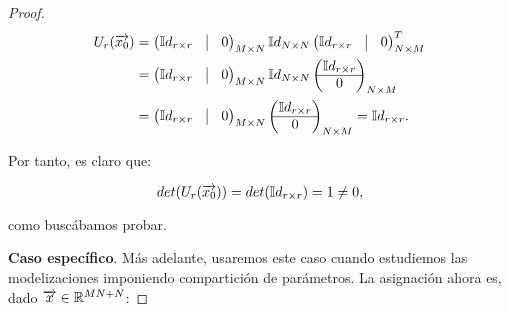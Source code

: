\begin{proof}
    \begin{equation}
        \begin{split}
            U_r(\nv{x_0}) &= \begin{pmatrix}
                \mathbb{I}d_{r \times r} & \vline & 0 \\
            \end{pmatrix}_{M \times N}
            \mathbb{I}d_{N \times N}
            \begin{pmatrix}
                \mathbb{I}d_{r \times r} & \vline & 0 \\
            \end{pmatrix}^T_{N \times M} \\
            &= \begin{pmatrix}
                \mathbb{I}d_{r \times r} & \vline & 0 \\
            \end{pmatrix}_{M \times N}
            \mathbb{I}d_{N \times N}
            \begin{pmatrix}
                \mathbb{I}d_{r \times r} \\
                \hline
                0
            \end{pmatrix}_{N \times M} \\
            &= \begin{pmatrix}
                \mathbb{I}d_{r \times r} & \vline & 0 \\
            \end{pmatrix}_{M \times N}
            \begin{pmatrix}
                \mathbb{I}d_{r \times r} \\
                \hline
                0
            \end{pmatrix}_{N \times M} = \mathbb{I}d_{r \times r}.
        \end{split}
    \end{equation}

    Por tanto, es claro que:

    \begin{equation}
        det(U_r(\overrightarrow{x_0})) = det(\mathbb{I}d_{r \times r}) = 1 \neq 0,
    \end{equation}

    como buscábamos probar.

    \textbf{Caso específico}. Más adelante, usaremos este caso cuando estudiemos las modelizaciones imponiendo compartición de parámetros. La asignación ahora es, dado $\overrightarrow{x} \in \mathbb{R}^{MN + N}$:


\end{proof}
